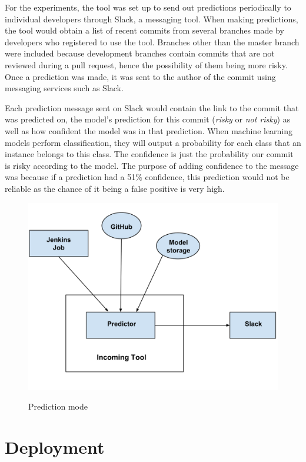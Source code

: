 \documentclass[../main.tex]{subfiles}
\begin{document}
For the experiments, the tool was set up to send out predictions periodically to individual developers through Slack, a messaging tool. When making predictions, the tool would obtain a list of recent commits from several branches made by developers who registered to use the tool. Branches other than the master branch were included because development branches contain commits that are not reviewed during a pull request, hence the possibility of them being more risky. Once a prediction was made, it was sent to the author of the commit using messaging services such as Slack. 

Each prediction message sent on Slack would contain the link to the commit that was predicted on, the model's prediction for this commit (\textit{risky} or \textit{not risky}) as well as how confident the model was in that prediction. When machine learning models perform classification, they will output a probability for each class that an instance belongs to this class. The confidence is just the probability our commit is risky according to the model. The purpose of adding confidence to the message was because if a prediction had a 51\% confidence, this prediction would not be reliable as the chance of it being a false positive is very high. 

\begin{figure}[H]
\centering
\includegraphics[scale=0.15]{images/Technical_Contribution/incoming_2.png}
\label{fig:incoming2}
\caption{Prediction mode}
\end{figure}

\section{Deployment}
\end{document}
